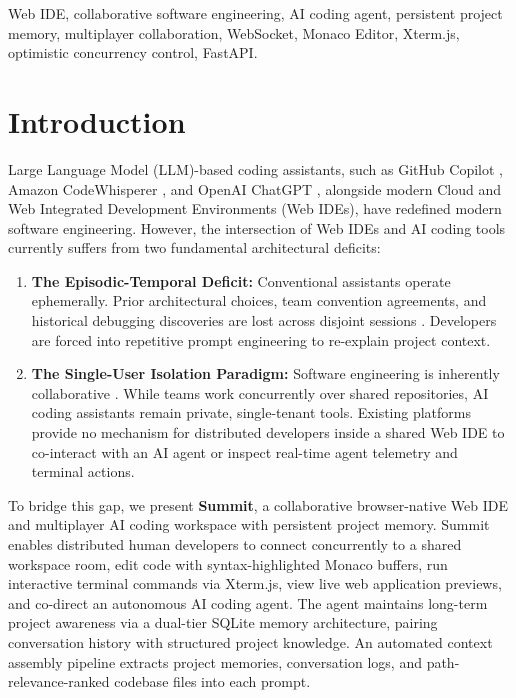 \documentclass[conference]{IEEEtran}
\begin{document}
\begin{IEEEkeywords}
Web IDE, collaborative software engineering, AI coding agent, persistent project memory, multiplayer collaboration, WebSocket, Monaco Editor, Xterm.js, optimistic concurrency control, FastAPI.
\end{IEEEkeywords}

\section{Introduction}
Large Language Model (LLM)-based coding assistants, such as GitHub Copilot \cite{copilot}, Amazon CodeWhisperer \cite{codewhisperer}, and OpenAI ChatGPT \cite{chatgpt}, alongside modern Cloud and Web Integrated Development Environments (Web IDEs), have redefined modern software engineering. However, the intersection of Web IDEs and AI coding tools currently suffers from two fundamental architectural deficits:

\begin{enumerate}
    \item \textbf{The Episodic-Temporal Deficit:} Conventional assistants operate ephemerally. Prior architectural choices, team convention agreements, and historical debugging discoveries are lost across disjoint sessions \cite{hatalis2024memory}. Developers are forced into repetitive prompt engineering to re-explain project context.
    \item \textbf{The Single-User Isolation Paradigm:} Software engineering is inherently collaborative \cite{ko2006exploratory}. While teams work concurrently over shared repositories, AI coding assistants remain private, single-tenant tools. Existing platforms provide no mechanism for distributed developers inside a shared Web IDE to co-interact with an AI agent or inspect real-time agent telemetry and terminal actions.
\end{enumerate}

To bridge this gap, we present \textbf{Summit}, a collaborative browser-native Web IDE and multiplayer AI coding workspace with persistent project memory. Summit enables distributed human developers to connect concurrently to a shared workspace room, edit code with syntax-highlighted Monaco buffers, run interactive terminal commands via Xterm.js, view live web application previews, and co-direct an autonomous AI coding agent. The agent maintains long-term project awareness via a dual-tier SQLite memory architecture, pairing conversation history with structured project knowledge. An automated context assembly pipeline extracts project memories, conversation logs, and path-relevance-ranked codebase files into each prompt.
\end{document}
